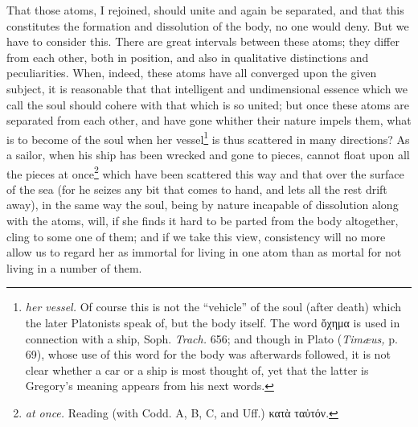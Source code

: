 That those atoms, I rejoined, should unite and again be separated, and that this constitutes the formation and dissolution of the body, no one would deny. But we have to consider this. There are great intervals between these atoms; they differ from each other, both in position, and also in qualitative distinctions and peculiarities. When, indeed, these atoms have all converged upon the given subject, it is reasonable that that intelligent and undimensional essence which we call the soul should cohere with that which is so united; but once these atoms are separated from each other, and have gone whither their nature impels them, what is to become of the soul when her vessel\footnote{\emph{her vessel.} Of course this is not the “vehicle” of the soul (after death) which the later Platonists speak of, but the body itself. The word \textgreek{ὄχημα} is used in connection with a ship, Soph. \emph{Trach.} 656; and though in Plato (\emph{Timæus,} p. 69), whose use of this word for the body was afterwards followed, it is not clear whether a car or a ship is most thought of, yet that the latter is Gregory’s meaning appears from his next words.} is thus scattered in many directions? As a sailor, when his ship has been wrecked and gone to pieces, cannot float upon all the pieces at once\footnote{\emph{at once.} Reading (with Codd. A, B, C, and Uff.) \textgreek{κατὰ ταὐτόν}.} which have been scattered this way and that over the surface of the sea (for he seizes any bit that comes to hand, and lets all the rest drift away), in the same way the soul, being by nature incapable of dissolution along with the atoms, will, if she finds it hard to be parted from the body altogether, cling to some one of them; and if we take this view, consistency will no more allow us to regard her as immortal for living in one atom than as mortal for not living in a number of them.

